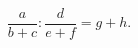 \documentclass[a4paper]{article}
\title{}
\begin{document}
	\maketitle
	\[
\frac{a}{b+c}: \frac{d}{e+f}=g+h
	.\] 
\end{document}
